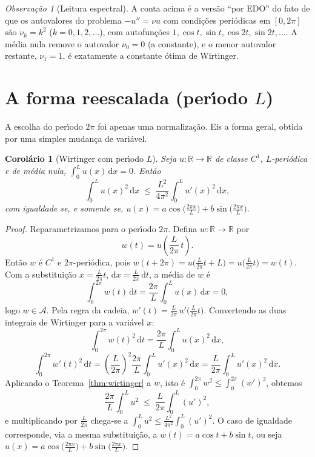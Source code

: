 \documentclass[11pt,a4paper]{amsart}
\newcommand{\R}{\mathbb{R}}
\renewcommand{\d}{\mathrm{d}}
\newcommand{\Adm}{\mathcal{A}}
\theoremstyle{plain}
\newtheorem{corolario}[teorema]{Corolário}
\theoremstyle{definition}
\theoremstyle{remark}
\newtheorem{observacao}[teorema]{Observação}
\begin{document}
\begin{observacao}[Leitura espectral]
A conta acima \'e a vers\~ao ``por EDO'' do fato de que os autovalores do
problema $-u''=\nu u$ com condi\c{c}\~oes peri\'odicas em $[0,2\pi]$ s\~ao
$\nu_k=k^2$ ($k=0,1,2,\dots$), com autofun\c{c}\~oes $1,\cos t,\sin t,\cos
2t,\sin 2t,\dots$. A m\'edia nula remove o autovalor $\nu_0=0$ (a
constante), e o menor autovalor restante, $\nu_1=1$, \'e exatamente a constante
\'otima de Wirtinger.
\end{observacao}

\section{A forma reescalada (per\'\i odo $L$)}
\label{sec:escala}

A escolha do per\'\i odo $2\pi$ foi apenas uma normaliza\c{c}\~ao. Eis a forma
geral, obtida por uma simples mudan\c{c}a de vari\'avel.

\begin{corolario}[Wirtinger com per\'\i odo $L$]\label{cor:escala}
Seja $u\colon\R\to\R$ de classe $C^1$, $L$-peri\'odica e de m\'edia nula,
$\int_0^L u(x)\,\d x = 0$. Ent\~ao
\[
  \int_0^L u(x)^2 \,\d x \;\le\; \frac{L^2}{4\pi^2}\int_0^L u'(x)^2 \,\d x ,
\]
com igualdade se, e somente se,
$u(x)=a\cos\!\big(\tfrac{2\pi x}{L}\big)+b\sin\!\big(\tfrac{2\pi x}{L}\big)$.
\end{corolario}

\begin{proof}
Reparametrizamos para o per\'\i odo $2\pi$. Defina $w\colon\R\to\R$ por
\[
  w(t) = u\!\left(\frac{L}{2\pi}\,t\right) .
\]
Ent\~ao $w$ \'e $C^1$ e $2\pi$-peri\'odica, pois
$w(t+2\pi)=u\big(\tfrac{L}{2\pi}t + L\big)=u\big(\tfrac{L}{2\pi}t\big)=w(t)$.
Com a substitui\c{c}\~ao $x=\tfrac{L}{2\pi}t$, $\d x=\tfrac{L}{2\pi}\,\d t$,
a m\'edia de $w$ \'e
\[
  \int_0^{2\pi} w(t)\,\d t
  = \frac{2\pi}{L}\int_0^L u(x)\,\d x = 0 ,
\]
logo $w\in\Adm$. Pela regra da cadeia, $w'(t)=\tfrac{L}{2\pi}\,u'\!\big(\tfrac{L}{2\pi}t\big)$.
Convertendo as duas integrais de Wirtinger para a vari\'avel $x$:
\[
  \int_0^{2\pi} w(t)^2\,\d t
  = \frac{2\pi}{L}\int_0^L u(x)^2\,\d x,
\]
\[
  \int_0^{2\pi} w'(t)^2\,\d t
  = \left(\frac{L}{2\pi}\right)^{\!2}\frac{2\pi}{L}\int_0^L u'(x)^2\,\d x
  = \frac{L}{2\pi}\int_0^L u'(x)^2\,\d x .
\]
Aplicando o Teorema~\ref{thm:wirtinger} a $w$, isto \'e
$\int_0^{2\pi}w^2\le\int_0^{2\pi}(w')^2$, obtemos
\[
  \frac{2\pi}{L}\int_0^L u^2 \;\le\; \frac{L}{2\pi}\int_0^L (u')^2 ,
\]
e multiplicando por $\tfrac{L}{2\pi}$ chega-se a
$\int_0^L u^2 \le \tfrac{L^2}{4\pi^2}\int_0^L (u')^2$. O caso de igualdade
corresponde, via a mesma substitui\c{c}\~ao, a $w(t)=a\cos t+b\sin t$, ou seja
$u(x)=a\cos\!\big(\tfrac{2\pi x}{L}\big)+b\sin\!\big(\tfrac{2\pi x}{L}\big)$.
\end{proof}
\end{document}
